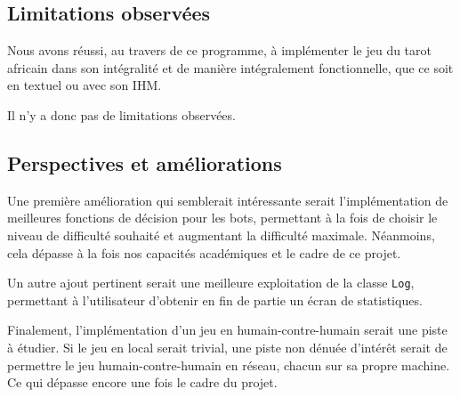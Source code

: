    \subsection{Limitations observées}\label{subsec:limitations-observées}
      Nous avons réussi, au travers de ce programme, à implémenter le jeu du tarot africain dans son intégralité et de manière intégralement fonctionnelle, que ce soit en textuel ou avec son IHM\@.

      Il n'y a donc pas de limitations observées.

   \subsection{Perspectives et améliorations}\label{subsec:perspectives-et-améliorations}
      Une première amélioration qui semblerait intéressante serait l'implémentation de meilleures fonctions de décision pour les bots, permettant à la fois de choisir le niveau de difficulté souhaité et augmentant la difficulté maximale.
      Néanmoins, cela dépasse à la fois nos capacités académiques et le cadre de ce projet.

      Un autre ajout pertinent serait une meilleure exploitation de la classe \texttt{Log}, permettant à l'utilisateur d'obtenir en fin de partie un écran de statistiques.

      Finalement, l'implémentation d'un jeu en humain-contre-humain serait une piste à étudier.
      Si le jeu en local serait trivial, une piste non dénuée d'intérêt serait de permettre le jeu humain-contre-humain en réseau, chacun sur sa propre machine.
      Ce qui dépasse encore une fois le cadre du projet.

